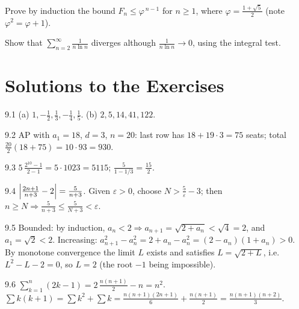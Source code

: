\begin{exercise}{\hard}
Prove by induction the bound $F_n \le \varphi^{\,n-1}$ for $n \ge 1$, where
$\varphi = \frac{1+\sqrt5}{2}$ (note $\varphi^2 = \varphi + 1$).
\end{exercise}

\begin{exercise}{\hard}
Show that $\sum_{n=2}^{\infty} \frac{1}{n \ln n}$ diverges although
$\frac{1}{n\ln n} \to 0$, using the integral test.
\end{exercise}

\section*{Solutions to the Exercises}

\begin{solution}{9.1}
(a) $1, -\tfrac12, \tfrac13, -\tfrac14, \tfrac15$.
(b) $2, 5, 14, 41, 122$.
\end{solution}

\begin{solution}{9.2}
AP with $a_1 = 18$, $d = 3$, $n = 20$: last row has $18 + 19\cdot3 = 75$
seats; total $\frac{20}{2}(18 + 75) = 10 \cdot 93 = 930$.
\end{solution}

\begin{solution}{9.3}
$5\,\frac{2^{10}-1}{2-1} = 5 \cdot 1023 = 5115$;\quad
$\frac{5}{1 - 1/3} = \frac{15}{2}$.
\end{solution}

\begin{solution}{9.4}
$\Bigl|\frac{2n+1}{n+3} - 2\Bigr| = \frac{5}{n+3}$. Given
$\varepsilon > 0$, choose $N > \frac{5}{\varepsilon} - 3$; then
$n \geq N \Rightarrow \frac{5}{n+3} \le \frac{5}{N+3} < \varepsilon$.
\end{solution}

\begin{solution}{9.5}
Bounded: by induction, $a_n < 2 \Rightarrow a_{n+1} = \sqrt{2 + a_n} <
\sqrt4 = 2$, and $a_1 = \sqrt2 < 2$. Increasing:
$a_{n+1}^2 - a_n^2 = 2 + a_n - a_n^2 = (2 - a_n)(1 + a_n) > 0$. By monotone
convergence the limit $L$ exists and satisfies $L = \sqrt{2 + L}$, i.e.\
$L^2 - L - 2 = 0$, so $L = 2$ (the root $-1$ being impossible).
\end{solution}

\begin{solution}{9.6}
$\sum_{k=1}^{n}(2k-1) = 2\,\frac{n(n+1)}{2} - n = n^2$.
$\sum k(k+1) = \sum k^2 + \sum k =
\frac{n(n+1)(2n+1)}{6} + \frac{n(n+1)}{2} = \frac{n(n+1)(n+2)}{3}$.
\end{solution}

